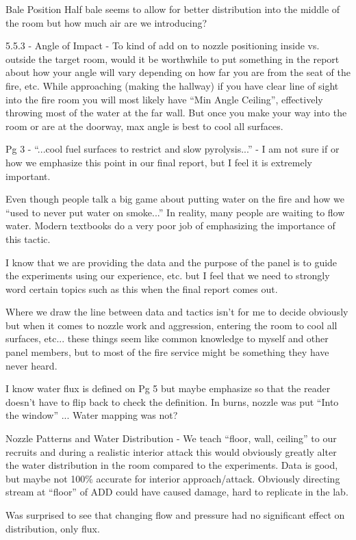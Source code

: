 \documentclass[12pt,oneside]{book}
\begin{document}
\begin{appendix}
Bale Position
Half bale seems to allow for better distribution into the middle of the room but how much air are we introducing?

5.5.3 - Angle of Impact - To kind of add on to nozzle positioning inside vs. outside the target room, would it be worthwhile to put something in the report about how your angle will vary depending on how far you are from the seat of the fire, etc.  While approaching (making the hallway) if you have clear line of sight into the fire room you will most likely have ``Min Angle Ceiling'', effectively throwing most of the water at the far wall.  But once you make your way into the room or are at the doorway, max angle is best to cool all surfaces.

Pg 3 -  ``...cool fuel surfaces to restrict and slow pyrolysis...'' - I am not sure if or how we emphasize this point in our final report, but I feel it is extremely important.  

Even though people talk a big game about putting water on the fire and how we ``used to never put water on smoke...'' In reality, many people are waiting to flow water.  Modern textbooks do a very poor job of emphasizing the importance of this tactic. 

I know that we are providing the data and the purpose of the panel is to guide the experiments using our experience, etc. but I feel that we need to strongly word certain topics such as this when the final report comes out. 

Where we draw the line between data and tactics isn't for me to decide obviously but when it comes to nozzle work and aggression, entering the room to cool all surfaces, etc... these things seem like common knowledge to myself and other panel members, but to most of the fire service might be something they have never heard.

I know water flux is defined on Pg 5 but maybe emphasize so that the reader doesn't have to flip back to check the definition. In burns, nozzle was put ``Into the window'' ... Water mapping was not?

Nozzle Patterns and Water Distribution - We teach ``floor, wall, ceiling'' to our recruits and during a realistic interior attack this would obviously greatly alter the water distribution in the room compared to the experiments.  Data is good, but maybe not 100\% accurate for interior approach/attack. Obviously directing stream at ``floor'' of ADD could have caused damage, hard to replicate in the lab. 

Was surprised to see that changing flow and pressure had no significant effect on distribution, only flux. 


\end{appendix}
\end{document}
